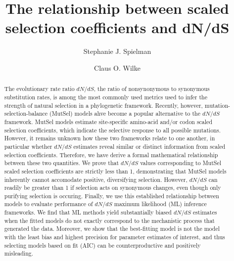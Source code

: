 \documentclass{pnastwo}
\begin{document}
	
	
\title{The relationship between scaled selection coefficients and dN/dS}
	
\author{Stephanie J. Spielman 
	\and
	Claus O. Wilke
}
	
\maketitle

\begin{article}
		
\begin{abstract} 
The evolutionary rate ratio $dN/dS$, the ratio of nonsynonymous to synonymous substitution rates, is among the most commonly used metrics used to infer the strength of natural selection in a phylogenetic framework.  Recently, however, mutation-selection-balance (MutSel) models ahve become a popular alternative to the $dN/dS$ framework. MutSel models estimate site-specific amino-acid and/or codon scaled selection coefficients, which indicate the selective response to all possible mutations. However, it remains unknown how these two frameworks relate to one another, in particular whether $dN/dS$ estimates reveal similar or distinct information from scaled selection coefficients. Therefore, we have derive a formal mathematical relationship between these two quantities. We prove that $dN/dS$ values corresponding to MutSel scaled selection coefficients are strictly less than 1, demonstrating that MutSel models inherently cannot accomodate positive, diversifying selection. However, $dN/dS$ can readily be greater than 1 if selection acts on synonymous changes, even though only purifying selection is occuring. Finally, we use this established relationship between models to evaluate performance of $dN/dS$ maximum likelihood (ML) inference frameworks. We find that ML methods yield substantially biased $dN/dS$ estimates when the fitted models do not exactly correspond to the mechanistic process that generated the data. Moreover, we show that the best-fitting model is not the model with the least bias and highest precision for parameter estimates of interest, and thus selecting models based on fit (AIC) can be counterproductive and positively misleading. 
\end{abstract}
		

\end{article}
\end{document}
